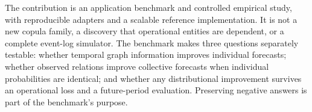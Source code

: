 The contribution is an application benchmark and controlled empirical study,
with reproducible adapters and a scalable reference implementation. It is not
a new copula family, a discovery that operational entities are dependent, or a
complete event-log simulator. The benchmark makes three questions separately
testable: whether temporal graph information improves individual forecasts;
whether observed relations improve collective forecasts when individual
probabilities are identical; and whether any distributional improvement
survives an operational loss and a future-period evaluation. Preserving negative
answers is part of the benchmark's purpose.
